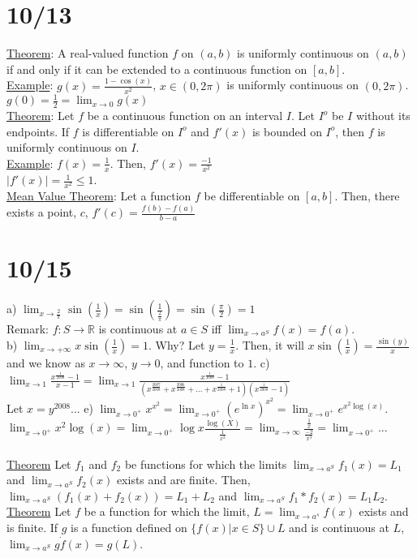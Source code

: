 \documentclass[11pt]{article}
\begin{document}
\section*{10/13}
	\underline{Theorem}: A real-valued function $f$ on $(a,b)$ is uniformly
	continuous on $(a,b)$ if and only if it can be extended to a continuous
	function on $[a,b]$.\\
	\underline{Example}: $g(x) = \frac{1 - \cos(x)}{x^2}$, $x \in (0, 2\pi)$
	is uniformly continuous on $(0, 2\pi)$.\\
	$g(0) = \frac{1}{2} = \lim_{x \to 0}{g(x)}$\\
	\underline{Theorem}: Let $f$ be a continuous function on an interval $I$.
	Let $I^o$ be $I$ without its endpoints. If $f$ is differentiable on $I^o$
	and $f'(x)$ is bounded on $I^o$, then $f$ is uniformly continuous on $I$.\\
	\underline{Example}: $f(x) = \frac{1}{x}$. Then, $f'(x) = \frac{-1}{x^2}$\\
	$|f'(x)| = \frac{1}{x^2} \le 1$.\\
	\underline{Mean Value Theorem}: Let a function $f$ be differentiable on 
	$[a,b]$. Then, there exists a point, $c$, $f'(c) = \frac{f(b) - f(a)}
	{b -a}$ \\
		
\section*{10/15}
	a) $\lim_{x \to \frac{2}{\pi}}{\sin(\frac{1}{x})} = \sin(\frac{1}{\frac{2}{\pi}}) = \sin(\frac{\pi}{2}) = 1$\\
	Remark: $f: S \to \mathbb{R}$ is continuous at $a \in S$ iff $\lim_{x \to
	a^S} f(x) = f(a)$.\\
	b) $\lim_{x \to +\infty}{x\sin(\frac{1}{x})} = 1$. Why? Let $y = \frac{1}{x}$. Then, it will $x\sin(\frac{1}{x}) = \frac{\sin(y)}{x}$ and we know as
	$x \to \infty$, $y \to 0$, and function to $1$.
	c) $\lim_{x \to 1}{\frac{x^{\frac{1}{2008}} - 1}{x - 1} = \lim_{x \to 1}
	\frac{x^{\frac{1}{2008}} - 1}{(x^{\frac{2007}{2008}} + x^{\frac
	{2006}{2008}}+ \ldots + x^{\frac{1}{2008}} + 1)(x^{\frac{1}{2008}} - 1)}}$\\
	Let $x = y^2008$...
	e) $\lim_{x \to 0^+}{x^{x^2}} = \lim_{x \to 0^+}{(e^{\ln x})^{x^2}} = \lim_
	{x \to 0^+}{e^{x^2\log(x)}}$.\\
	$\lim_{x \to 0^+}{x^2\log(x)} = \lim_{x \to 0^+}{\log x}{\frac{\log(X)}{
	\frac{1}{x^2}}} = \lim_{x \to \infty}{\frac{\frac{1}{x}}{\frac{-2}{x^3}}}
	= \lim_{x \to 0^+}{} ... $\\\\
	\underline{Theorem} Let $f_1$ and $f_2$ be functions for which the limits
	$\lim_{x \to a^S}{f_1(x) = L_1}$ and $\lim_{ x \to a^S}{f_2(x)}$ exists
	and are finite. Then, $\lim_{x \to a^S}{(f_1(x) + f_2(x))} = L_1 + L_2$ and
	$\lim_{x \to a^S}{f_1*f_2}(x) = L_1L_2$. \\
	\underline{Theorem} Let $f$ be a function for which the limit, $L = 
	\lim_{x \to a^s}{f(x)}$ exists and is finite. If $g$ is a function defined
	on $\{f(x) | x \in S\} \cup {L}$ and is continuous at $L$, $\lim_{x \to
	a^S}{g \dot f(x)} = g(L)$.
\end{document}
